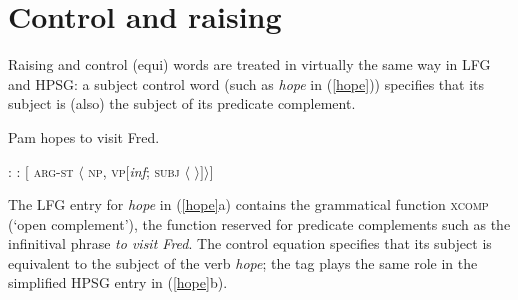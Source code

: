 
%


\section{Control and raising}

Raising and control (equi) words are treated in virtually the same way in LFG and HPSG: a subject control word (such as \textit{hope} in (\ref{hope})) specifies that its subject is (also) the subject of its predicate complement.  

\begin{exe} 
\ex	\label{hope}
Pam hopes to visit Fred.
\begin{xlist} 
\ex	
{}: \qquad {}
\ex 
{}:  \qquad  $[$ \textsc{arg-st} $\langle$ \textsc{np}, \textsc{vp}[\textit{inf}; \textsc{subj} $\langle$  $ \rangle ] \rangle ]$
\end{xlist}
\end{exe}
The LFG entry for \textit{hope} in (\ref{hope}a) contains the grammatical function \textsc{xcomp} (`open complement'), the function reserved for predicate complements such as the infinitival phrase \textit{to visit Fred}.  The control equation specifies that its subject is equivalent to the subject of the verb \textit{hope}; the  tag  plays the same role in the simplified HPSG entry in (\ref{hope}b).  

